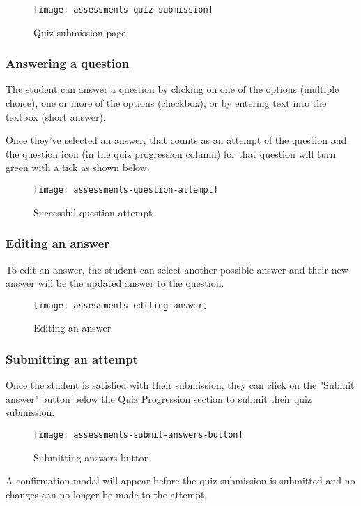 \begin{figure}[h!]
	\centering
	\texttt{[image: assessments-quiz-submission]}
	\caption{Quiz submission page}
\end{figure}

\subsubsection{Answering a question}
The student can answer a question by clicking on one of the options (multiple choice), one or more of the options (checkbox), or by entering text into the textbox (short answer). 

Once they've selected an answer, that counts as an attempt of the question and the question icon (in the quiz progression column) for that question will turn green with a tick as shown below.

\begin{figure}[h!]
	\centering
	\texttt{[image: assessments-question-attempt]}
	\caption{Successful question attempt}
\end{figure}


\subsubsection{Editing an answer}
To edit an answer, the student can select another possible answer and their new answer will be the updated answer to the question.

\begin{figure}[h!]
	\centering
	\texttt{[image: assessments-editing-answer]}
	\caption{Editing an answer}
\end{figure}


\subsubsection{Submitting an attempt}
Once the student is satisfied with their submission, they can click on the "Submit answer" button below the Quiz Progression section to submit their quiz submission.

\begin{figure}[h!]
	\centering
	\texttt{[image: assessments-submit-answers-button]}
	\caption{Submitting answers button}
\end{figure}

A confirmation modal will appear before the quiz submission is submitted and no changes can no longer be made to the attempt.


